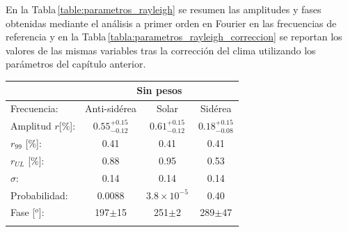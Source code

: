 		
En la Tabla\,\ref{table:parametros_rayleigh} se resumen las amplitudes y fases obtenidas mediante el análisis a primer orden en Fourier en las frecuencias de referencia  y en la Tabla\,\ref{tabla:parametros_rayleigh_correccion} se reportan los valores de las mismas variables tras la corrección del clima utilizando los parámetros del capítulo anterior.
		\begin{table}[H]
		\centering
		\begin{tabular}{rc|c|c|}
			\cline{2-4}
			\multicolumn{1}{r|}{} & \multicolumn{3}{c|}{Sin pesos} 							 \\ \hline
			\multicolumn{1}{|l|}{Frecuencia:   }    & Anti-sidérea          & Solar          				& Sidérea     	 \\ \hline
			\multicolumn{1}{|l|}{Amplitud $r$[\%]:} & $0.55^{+0.15}_{-0.12}$& $0.61^{+0.15}_{-0.12}$        & $0.18^{+0.15}_{-0.08}$ \\
			\multicolumn{1}{|l|}{$r_{99}$ [\%]:   } & 0.41                  & 0.41                          & 0.41       \\
			\multicolumn{1}{|l|}{$r_{UL}$ [\%]:   } & 0.88                  & 0.95                          & 0.53       \\
			\multicolumn{1}{|l|}{$\sigma$:        } & 0.14                  & 0.14                          & 0.14          \\\hline
			\multicolumn{1}{|l|}{Probabilidad:    } & 0.0088                & $3.8\times 10^{-5}$                          & 0.40          \\
			\multicolumn{1}{|l|}{Fase [$^o$]:            } & 197$\pm$15            & 251$\pm$2                    & 289$\pm$47    \\\hline \\   \cline{2-4}
			

\end{tabular}
\end{table}
